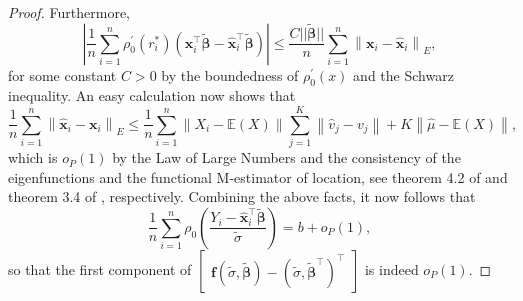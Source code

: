 \documentclass[11pt]{article}
\begin{document}
\begin{proof}
Furthermore, 
\begin{equation*}
\left| \frac{1}{n} \sum_{i=1}^n  \rho^{\prime}_0\left(r_i^{*} \right) \left(  \mathbf{x}_i^{\top} \widetilde{\boldsymbol{\beta}} -  \widehat{\mathbf{x}}_i^{\top} \widetilde{\boldsymbol{\beta}} \right) \right| \leq \frac{C ||\boldsymbol{\widetilde{\beta}} ||}{n} \sum_{i=1}^n \left\| \mathbf{x}_i - \widehat{\mathbf{x}}_i \right\|_{E},
\end{equation*}
for some constant $C>0$ by the boundedness of $\rho_{0}^{\prime}(x)$ and the Schwarz inequality. An easy calculation now shows that
\begin{equation*}
\frac{1}{n} \sum_{i=1}^n \left\|\mathbf{\widehat{x}}_i - \mathbf{x}_i  \right\|_{E} \leq \frac{1}{n} \sum_{i=1}^n  \left\| X_i -\mathbb{E}(X) \right\| \sum_{j=1}^K \left\| \widehat{v}_j -v_j \right\| + K \left\|\widehat{\mu}-\mathbb{E}(X) \right\|,
\end{equation*}
which is $o_{P}(1)$ by the Law of Large Numbers and  the consistency of the eigenfunctions and the functional M-estimator of location, see theorem 4.2 of \cite{bali2011robust} and theorem 3.4 of \cite{sinova2018m}, respectively. Combining the above facts, it now follows that
\begin{equation}
\frac{1}{n}\sum_{i=1}^n \rho_0 \left( \frac{Y_i - \widehat{\mathbf{x}}_i^{\top} \widetilde{\boldsymbol{\beta}} }{\widetilde{\sigma}} \right) = b + o_P(1),
\end{equation}
so that the first component of $\begin{bmatrix} \mathbf{f} \left(\widetilde{\sigma}, \widetilde{\boldsymbol{\beta}} \right)
-\left(\widetilde{\sigma}, \boldsymbol{\widetilde{\beta}}^{\top} \right)^{\top}\end{bmatrix}$ is indeed $o_P(1)$. 


\end{proof}
\end{document}
